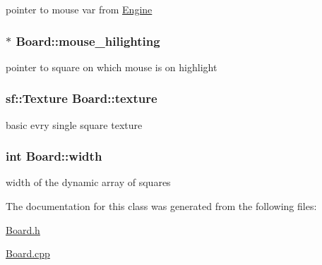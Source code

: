 pointer to mouse var from \hyperlink{class_engine}{Engine} 

\hypertarget{class_board_a27c871bcf6b8eb8bb8af2f28a4c7a909}{}
\subsubsection[{mouse\+\_\+hilighting}]{$\ast$ Board\+::mouse\+\_\+hilighting\hspace{0.3cm}{\ttfamily [private]}}\label{class_board_a27c871bcf6b8eb8bb8af2f28a4c7a909}


pointer to square on which mouse is on highlight 

\hypertarget{class_board_a34d04abd4e0c5212e5a32cdd39263298}{}
\subsubsection[{texture}]{\setlength{\rightskip}{0pt plus 5cm}sf\+::\+Texture Board\+::texture\hspace{0.3cm}{\ttfamily [private]}}\label{class_board_a34d04abd4e0c5212e5a32cdd39263298}


basic evry single square texture 

\hypertarget{class_board_a90a8efaa4736af25511ac948bdd27d6c}{}
\subsubsection[{width}]{\setlength{\rightskip}{0pt plus 5cm}int Board\+::width\hspace{0.3cm}{\ttfamily [private]}}\label{class_board_a90a8efaa4736af25511ac948bdd27d6c}


width of the dynamic array of squares 



The documentation for this class was generated from the following files\+:\begin{DoxyCompactItemize}
\item 
\hyperlink{_board_8h}{Board.\+h}\item 
\hyperlink{_board_8cpp}{Board.\+cpp}\end{DoxyCompactItemize}
